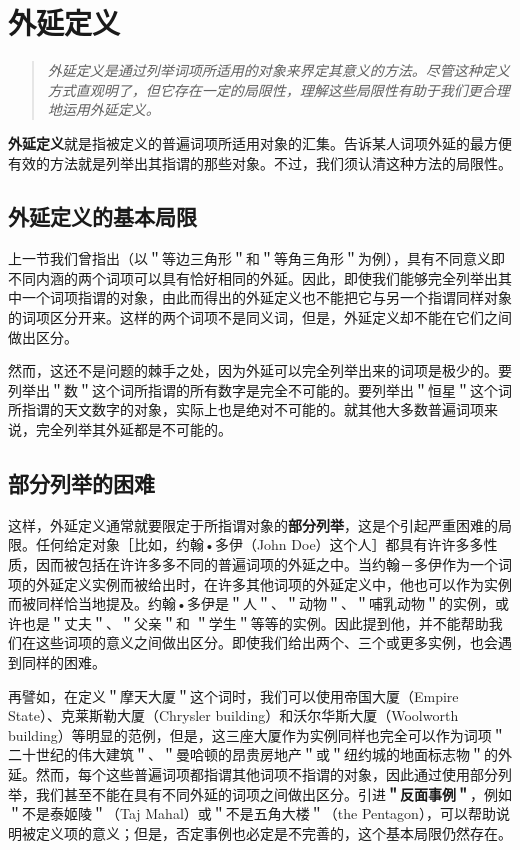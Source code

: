 \section{外延定义}

\begin{quotation}
\textit{外延定义是通过列举词项所适用的对象来界定其意义的方法。尽管这种定义方式直观明了，但它存在一定的局限性，理解这些局限性有助于我们更合理地运用外延定义。}
\end{quotation}

\textbf{外延定义}就是指被定义的普遍词项所适用对象的汇集。告诉某人词项外延的最方便有效的方法就是列举出其指谓的那些对象。不过，我们须认清这种方法的局限性。

\subsection{外延定义的基本局限}

上一节我们曾指出（以＂等边三角形＂和＂等角三角形＂为例），具有不同意义即不同内涵的两个词项可以具有恰好相同的外延。因此，即使我们能够完全列举出其中一个词项指谓的对象，由此而得出的外延定义也不能把它与另一个指谓同样对象的词项区分开来。这样的两个词项不是同义词，但是，外延定义却不能在它们之间做出区分。

然而，这还不是问题的棘手之处，因为外延可以完全列举出来的词项是极少的。要列举出＂数＂这个词所指谓的所有数字是完全不可能的。要列举出＂恒星＂这个词所指谓的天文数字的对象，实际上也是绝对不可能的。就其他大多数普遍词项来说，完全列举其外延都是不可能的。

\subsection{部分列举的困难}

这样，外延定义通常就要限定于所指谓对象的\textbf{部分列举}，这是个引起严重困难的局限。任何给定对象［比如，约翰•多伊（John Doe）这个人］都具有许许多多性质，因而被包括在许许多多不同的普遍词项的外延之中。当约翰－多伊作为一个词项的外延定义实例而被给出时，在许多其他词项的外延定义中，他也可以作为实例而被同样恰当地提及。约翰•多伊是＂人＂、＂动物＂、＂哺乳动物＂的实例，或许也是＂丈夫＂、＂父亲＂和 ＂学生＂等等的实例。因此提到他，并不能帮助我们在这些词项的意义之间做出区分。即使我们给出两个、三个或更多实例，也会遇到同样的困难。

再譬如，在定义＂摩天大厦＂这个词时，我们可以使用帝国大厦（Empire State）、克莱斯勒大厦（Chrysler building）和沃尔华斯大厦（Woolworth building）等明显的范例，但是，这三座大厦作为实例同样也完全可以作为词项＂二十世纪的伟大建筑＂、＂曼哈顿的昂贵房地产＂或＂纽约城的地面标志物＂的外延。然而，每个这些普遍词项都指谓其他词项不指谓的对象，因此通过使用部分列举，我们甚至不能在具有不同外延的词项之间做出区分。引进\textbf{＂反面事例＂}，例如＂不是泰姬陵＂（Taj Mahal）或＂不是五角大楼＂（the Pentagon），可以帮助说明被定义项的意义；但是，否定事例也必定是不完善的，这个基本局限仍然存在。


